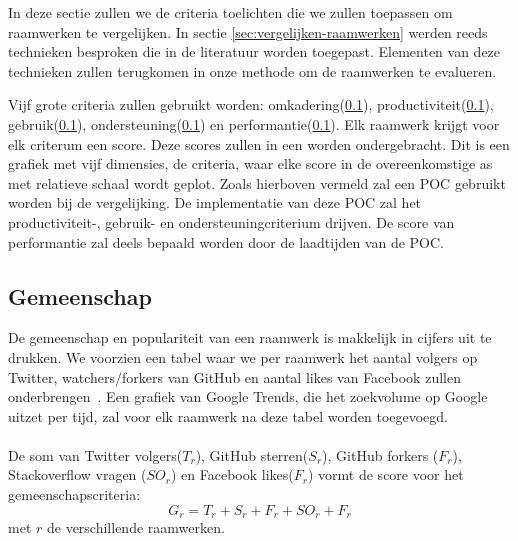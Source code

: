 In deze sectie zullen we de criteria toelichten die we zullen toepassen om raamwerken te vergelijken.
In sectie \ref{sec:vergelijken-raamwerken} werden reeds technieken besproken die in de literatuur worden toegepast.
Elementen van deze technieken zullen terugkomen in onze methode om de raamwerken te evalueren.

Vijf grote criteria zullen gebruikt worden:  omkadering(\ref{sec:vergelijking-gemeenschap}), productiviteit(\ref{sec:vergelijking-gemeenschap}), gebruik(\ref{sec:vergelijking-gemeenschap}), ondersteuning(\ref{sec:vergelijking-gemeenschap}) en performantie(\ref{sec:vergelijking-gemeenschap}). Elk raamwerk krijgt voor elk criterum een score. 
Deze scores zullen in een  worden ondergebracht.  
Dit is een grafiek met vijf dimensies,  de criteria,     waar elke score in de overeenkomstige as met relatieve schaal wordt geplot.
Zoals hierboven vermeld zal een POC gebruikt worden bij de vergelijking.
De implementatie van deze POC zal het productiviteit-, gebruik- en ondersteuningcriterium drijven.  
De score van performantie zal deels bepaald worden door de laadtijden van de POC.



\subsection{Gemeenschap}
\label{sec:vergelijking-gemeenschap}
De gemeenschap en populariteit van een raamwerk is makkelijk in cijfers uit te drukken. 
We voorzien een tabel waar we per raamwerk het aantal volgers op Twitter, watchers/forkers van GitHub en aantal likes van Facebook zullen onderbrengen~\cite{Sarrafi2012a,Ayuso2012}. 
Een grafiek van Google Trends, die het zoekvolume op Google uitzet per tijd, zal voor elk raamwerk na deze tabel worden toegevoegd.
\paragraph{}
De som van Twitter volgers($T_r$), GitHub sterren($S_r$), GitHub forkers ($F_r$), Stackoverflow vragen ($SO_r$) en Facebook likes($F_r$) vormt de score voor het gemeenschapscriteria:
\begin{equation}
  G_r=T_r+S_r+F_r+SO_r+F_r
  \label{eq:gemeenschap}
\end{equation}
met $r$ de verschillende raamwerken.

